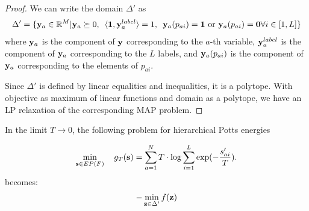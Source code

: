{{{{\begin{proof}
    We can write the domain $\Delta'$ as 
    \begin{equation}
    \Delta' = \{ {\bf y}_a \in \mathbb{R}^M | {\bf y}_a \succeq 0, \enskip \langle {\bf 1}, {\bf y}_a^{label} \rangle = 1, \enskip {\bf y}_a(p_{ai}) = {\bf 1} \textrm{ or } {\bf y}_a(p_{ai}) = {\bf 0} \forall i \in [1, L]\}
    \end{equation} 
where ${\bf y}_a$ is the component of $\bf y$ corresponding to the $a$-th variable, ${\bf y}_a^{label}$  is the component of ${\bf y}_a$ corresponding to the $L$ labels, and ${\bf y}_a(p_{ai})$ is the component of ${\bf y}_a$ corresponding to the elements of $p_{ai}$. 

    Since $\Delta'$ is defined by linear equalities and inequalities, it is a polytope. With objective as maximum of linear functions and domain as a polytope, we have an LP relaxation of the corresponding MAP problem.
\end{proof}


{\proposition In the limit $T \to 0$, the following problem for hierarchical Potts energies 

\begin{equation}
\min_{{\bf s} \in EP(F)} \quad g_T ({\bf s}) = \sum_{a = 1}^{N} T \cdot \log \sum_{i = 1}^L \exp(-\frac{s'_{ai}}{T}).
\end{equation}
becomes:
\begin{align}
    - \min_{{\bf z} \in \Delta'} f({\bf z}) 
\end{align}

}}}}}
